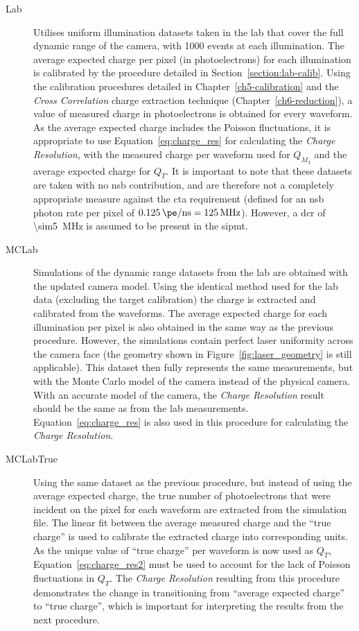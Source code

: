 \begin{description}
\item [Lab] Utilises uniform illumination datasets taken in the lab that cover the full dynamic range of the camera, with 1000 events at each illumination. The average expected charge per pixel (in photoelectrons) for each illumination is calibrated by the procedure detailed in Section~\ref{section:lab-calib}. Using the calibration procedures detailed in Chapter~\ref{ch5-calibration} and the \textit{Cross Correlation} charge extraction technique (Chapter~\ref{ch6-reduction}), a value of measured charge in photoelectrons is obtained for every waveform. As the average expected charge includes the Poisson fluctuations, it is appropriate to use Equation~\ref{eq:charge_res} for calculating the \textit{Charge Resolution}, with the measured charge per waveform used for ${Q_M}_i$ and the average expected charge for $Q_T$. It is important to note that these datasets are taken with no \gls{nsb} contribution, and are therefore not a completely appropriate measure against the \gls{cta} requirement (defined for an \gls{nsb} photon rate per pixel of $\SI{0.125}{\pe/ns} = \SI{125}{MHz}$). However, a \gls{dcr} of \SI{\sim5}{MHz} is assumed to be present in the \gls{sipmt}.
\item [MCLab] Simulations of the dynamic range datasets from the lab are obtained with the updated  camera model. Using the identical method used for the lab data (excluding the \gls{target} calibration) the charge is extracted and calibrated from the waveforms. The average expected charge for each illumination per pixel is also obtained in the same way as the previous procedure. However, the simulations contain perfect laser uniformity across the camera face (the geometry shown in Figure~\ref{fig:laser_geometry} is still applicable). This dataset then fully represents the same measurements, but with the Monte Carlo model of the camera instead of the physical camera. With an accurate model of the camera, the \textit{Charge Resolution} result should be the same as from the lab measurements. Equation~\ref{eq:charge_res} is also used in this procedure for calculating the \textit{Charge Resolution}.
\item [MCLabTrue] Using the same dataset as the previous procedure, but instead of using the average expected charge, the true number of photoelectrons that were incident on the pixel for each waveform are extracted from the simulation file. The linear fit between the average measured charge and the ``true charge'' is used to calibrate the extracted charge into corresponding units. As the unique value of ``true charge'' per waveform is now used as $Q_T$, Equation~\ref{eq:charge_res2} must be used to account for the lack of Poisson fluctuations in $Q_T$. The \textit{Charge Resolution} resulting from this procedure demonstrates the change in transitioning from ``average expected charge'' to ``true charge'', which is important for interpreting the results from the next procedure.

\end{description}

